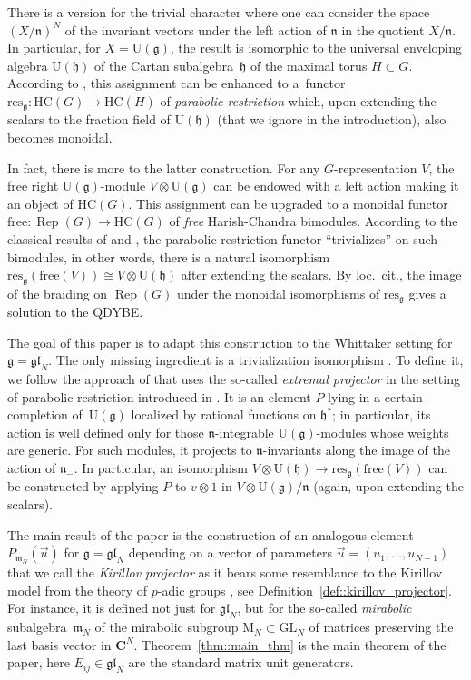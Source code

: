 \documentclass[10pt,a4paper]{amsart}
\numberwithin{equation}{section}
\newcommand{\C}{\mathbf{C}}
\newcommand{\Z}{\mathbf{Z}}
\newcommand{\GL}{\mathrm{GL}}
\newcommand{\g}{\mathfrak{g}}
\newcommand{\h}{\mathfrak{h}}
\newcommand{\n}{\mathfrak{n}}
\newcommand{\m}{\mathfrak{m}}
\newcommand{\free}{\mathrm{free}}
\DeclareMathOperator{\Rep}{Rep}
\newcommand{\res}{\mathrm{res}}
\newcommand{\gl}{\mathfrak{gl}}
\begin{document}
	There is a version for the trivial character where one can consider the space $(X/\n)^{N}$ of the invariant vectors under the left action of $\n$ in the quotient $X/\n$. In particular, for $X = \mathrm{U}(\g)$, the result is isomorphic to the universal enveloping algebra $\mathrm{U}(\h)$ of the Cartan subalgebra~$\h$ of the maximal torus $H\subset G$. According to \cite{KalmykovSafronov}, this assignment can be enhanced to a~functor~${\res_{\g} \colon \mathrm{HC}(G) \rightarrow \mathrm{HC}(H)}$ of \emph{parabolic restriction} which, upon extending the scalars to the fraction field of $\mathrm{U}(\h)$ (that we ignore in the introduction), also becomes monoidal.
	
	In fact, there is more to the latter construction. For any $G$-representation $V$, the free right $\mathrm{U}(\g)$-module $V \otimes \mathrm{U}(\g)$ can be endowed with a left action making it an object of $\mathrm{HC}(G)$. This assignment can be upgraded to a monoidal functor $\free \colon \Rep(G) \rightarrow \mathrm{HC}(G)$ of \emph{free} Harish-Chandra bimodules. According to the classical results of \cite{ZhelobenkoSalgebras} and \cite{EtingofVarchenkoExchange}, the parabolic restriction functor ``trivializes'' on such bimodules, in other words, there is a natural isomorphism~${\res_{\g}(\free(V)) \cong V \otimes \mathrm{U}(\h)}$ after extending the scalars. By loc.\ cit., the image of the braiding on $\Rep(G)$ under the monoidal isomorphisms of $\res_{\g}$ gives a solution to the QDYBE.
	
	The goal of this paper is to adapt this construction to the Whittaker setting for $\g=\gl_N$. The only missing ingredient is a trivialization isomorphism \smash{$\res_{\gl_N}^{\psi}(\free(V)) \cong V \otimes \Z_{\gl_N}$}. To define it, we follow the approach of \cite{ZhelobenkoSalgebras} that uses the so-called \emph{extremal projector} in the setting of parabolic restriction introduced in \cite{AsherovaSmirnovTolstoy}. It is an element $P$ lying in a certain completion of~$\mathrm{U}(\g)$ localized by rational functions on $\h^*$; in particular, its action is well defined only for those $\n$-integrable $\mathrm{U}(\g)$-modules whose weights are generic. For such modules, it projects to $\n$-invariants along the image of the action of $\n_-$. In particular, an isomorphism $V \otimes \mathrm{U}(\h) \rightarrow \res_{\g}(\free(V))$ can be constructed by applying $P$ to $v\otimes 1$ in $V \otimes \mathrm{U}(\g)/\n$ (again, upon extending the scalars).
	
	The main result of the paper is the construction of an analogous element $P_{\m_N}(\vec{u})$ for $\g=\gl_N$ depending on a vector of parameters $\vec{u}=(u_1,\dots,u_{N-1})$ that we call the \emph{Kirillov projector} as it bears some resemblance to the Kirillov model from the theory of $p$-adic groups \cite{Kirillov}, see Definition~\ref{def::kirillov_projector}. For instance, it is defined not just for $\gl_N$, but for the so-called \emph{mirabolic} subalgebra~$\m_N$ of the mirabolic subgroup $\mathrm{M}_N \subset \GL_N$ of matrices preserving the last basis vector in $\C^N$. Theorem~\ref{thm::main_thm} is the main theorem of the paper, here $E_{ij} \in \gl_N$ are the standard matrix unit generators.
	
\end{document}
